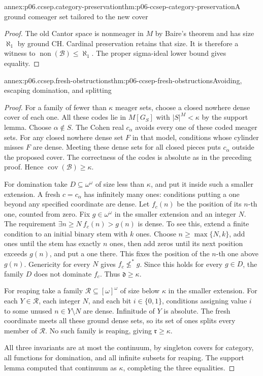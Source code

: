\begin{annexitem}{annex:p06.ccsep.category-preservation}{thm:p06-ccsep-category-preservation}{A ground comeager set tailored to the new cover}
\begin{proof}
The old Cantor space is nonmeager in \(M\) by Baire's theorem and
has size \(\aleph_1\) by ground CH. Cardinal preservation retains
that size. It is therefore a witness to
\(\operatorname{non}(\mathcal B)\leq\aleph_1\). The proper
sigma-ideal lower bound gives equality.
\end{proof}
\end{annexitem}

\begin{annexitem}{annex:p06.ccsep.fresh-obstructions}{thm:p06-ccsep-fresh-obstructions}{Avoiding, escaping domination, and splitting}
\begin{proof}
For a family of fewer than \(\kappa\) meager sets, choose a
closed nowhere dense cover of each one. All these codes lie in
\(M[G_S]\) with \(|S|^M<\kappa\) by the support lemma. Choose
\(\alpha\notin S\). The Cohen real \(c_\alpha\) avoids every
one of these coded meager sets. For any closed nowhere dense set
\(F\) in that model, conditions whose cylinder misses \(F\)
are dense. Meeting these dense sets for all closed pieces puts
\(c_\alpha\) outside the proposed cover. The correctness of the
codes is absolute as in the preceding proof. Hence
\(\operatorname{cov}(\mathcal B)\geq\kappa\).

For domination take \(D\subseteq\omega^\omega\) of size less
than \(\kappa\), and put it inside such a smaller extension.
A fresh \(c=c_\alpha\) has infinitely many ones: conditions
putting a one beyond any specified coordinate are dense. Let
\(f_c(n)\) be the position of its \(n\)-th one, counted from
zero. Fix \(g\in\omega^\omega\) in the smaller extension and
an integer \(N\). The requirement
\(\exists n\geq N\ f_c(n)>g(n)\) is dense. To see this,
extend a finite condition to an initial binary stem with \(k\)
ones. Choose \(n\geq\max\{N,k\}\), add ones until the stem
has exactly \(n\) ones, then add zeros until its next position
exceeds \(g(n)\), and put a one there. This fixes the position
of the \(n\)-th one above \(g(n)\). Genericity for every \(N\)
gives \(f_c\not\leq^*g\). Since this holds for every \(g\in D\),
the family \(D\) does not dominate \(f_c\). Thus
\(\mathfrak d\geq\kappa\).

For reaping take a family \(\mathcal R\subseteq[\omega]^\omega\)
of size below \(\kappa\) in the smaller extension. For each
\(Y\in\mathcal R\), each integer \(N\), and each bit
\(i\in\{0,1\}\), conditions assigning value \(i\) to some
unused \(n\in Y\setminus N\) are dense. Infinitude of \(Y\)
is absolute. The fresh coordinate meets all these ground dense
sets, so its set of ones splits every member of \(\mathcal R\).
No such family is reaping, giving \(\mathfrak r\geq\kappa\).

All three invariants are at most the continuum, by singleton covers
for category, all functions for domination, and all infinite subsets
for reaping. The support lemma computed that continuum as
\(\kappa\), completing the three equalities.
\end{proof}
\end{annexitem}

